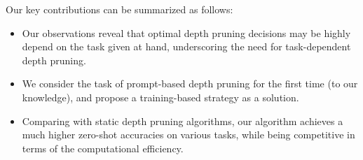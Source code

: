 Our key contributions can be summarized as follows:
\begin{itemize}[leftmargin=*,topsep=0pt,parsep=0pt,itemsep=1.5pt]
\item Our observations reveal that optimal depth pruning decisions may be highly depend on the task given at hand, underscoring the need for task-dependent depth pruning.
\item We consider the task of prompt-based depth pruning for the first time (to our knowledge), and propose a training-based strategy as a solution.
\item Comparing with static depth pruning algorithms, our algorithm achieves a much higher zero-shot accuracies on various tasks, while being competitive in terms of the computational efficiency.
\end{itemize}
